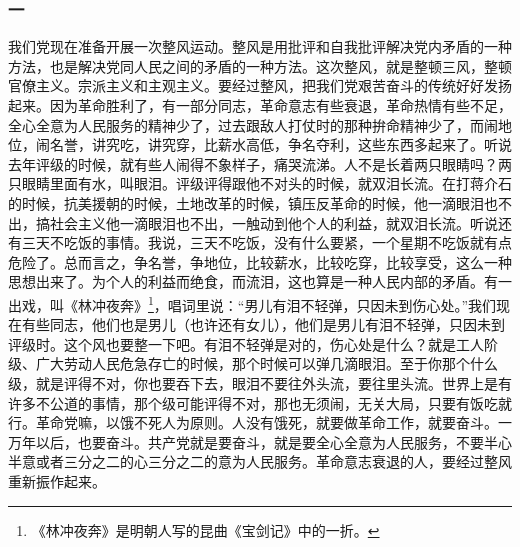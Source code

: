 \documentclass[cn,11pt,chinese]{elegantbook}
\def\myformat#1{\hfil\hfil #1}
\begin{document}
\subsubsection*{\myformat{一}}
我们党现在准备开展一次整风运动。整风是用批评和自我批评解决党内矛盾的一种方法，也是解决党同人民之间的矛盾的一种方法。这次整风，就是整顿三风，整顿官僚主义。宗派主义和主观主义。要经过整风，把我们党艰苦奋斗的传统好好发扬起来。因为革命胜利了，有一部分同志，革命意志有些衰退，革命热情有些不足，全心全意为人民服务的精神少了，过去跟敌人打仗时的那种拚命精神少了，而闹地位，闹名誉，讲究吃，讲究穿，比薪水高低，争名夺利，这些东西多起来了。听说去年评级的时候，就有些人闹得不象样子，痛哭流涕。人不是长着两只眼睛吗？两只眼睛里面有水，叫眼泪。评级评得跟他不对头的时候，就双泪长流。在打蒋介石的时候，抗美援朝的时候，土地改革的时候，镇压反革命的时候，他一滴眼泪也不出，搞社会主义他一滴眼泪也不出，一触动到他个人的利益，就双泪长流。听说还有三天不吃饭的事情。我说，三天不吃饭，没有什么要紧，一个星期不吃饭就有点危险了。总而言之，争名誉，争地位，比较薪水，比较吃穿，比较享受，这么一种思想出来了。为个人的利益而绝食，而流泪，这也算是一种人民内部的矛盾。有一出戏，叫《林冲夜奔》\footnote[1]{《林冲夜奔》是明朝人写的昆曲《宝剑记》中的一折。}，唱词里说：“男儿有泪不轻弹，只因未到伤心处。”我们现在有些同志，他们也是男儿（也许还有女儿），他们是男儿有泪不轻弹，只因未到评级时。这个风也要整一下吧。有泪不轻弹是对的，伤心处是什么？就是工人阶级、广大劳动人民危急存亡的时候，那个时候可以弹几滴眼泪。至于你那个什么级，就是评得不对，你也要吞下去，眼泪不要往外头流，要往里头流。世界上是有许多不公道的事情，那个级可能评得不对，那也无须闹，无关大局，只要有饭吃就行。革命党嘛，以饿不死人为原则。人没有饿死，就要做革命工作，就要奋斗。一万年以后，也要奋斗。共产党就是要奋斗，就是要全心全意为人民服务，不要半心半意或者三分之二的心三分之二的意为人民服务。革命意志衰退的人，要经过整风重新振作起来。\\
\end{document}
